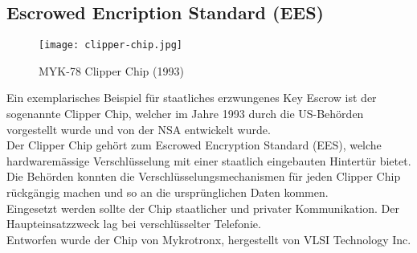 	\subsection{Escrowed Encription Standard (EES)}
\begin{figure}[H]
	\centering
	\texttt{[image: clipper-chip.jpg]}
	\caption{MYK-78 Clipper Chip (1993)}
	\label{fig:clipper-chip}
\end{figure}
Ein exemplarisches Beispiel für staatliches erzwungenes Key Escrow ist der sogenannte Clipper Chip, welcher im Jahre 1993 durch die US-Behörden vorgestellt wurde und von der NSA entwickelt wurde.\\
Der Clipper Chip gehört zum Escrowed Encryption Standard (EES), welche hardwaremässige Verschlüsselung mit einer staatlich eingebauten Hintertür bietet. Die Behörden konnten die Verschlüsselungsmechanismen für jeden Clipper Chip rückgängig machen und so an die ursprünglichen Daten kommen. \\
Eingesetzt werden sollte der Chip staatlicher und privater Kommunikation. Der Haupteinsatzzweck lag bei verschlüsselter Telefonie. \cite{ees}\\
Entworfen wurde der Chip von Mykrotronx, hergestellt von VLSI Technology Inc. \\

